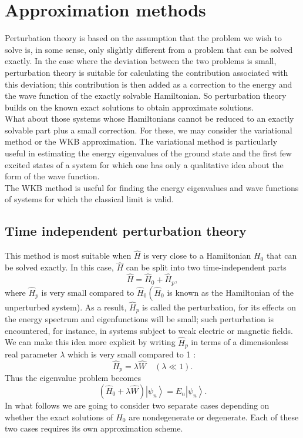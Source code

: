 \chapter{Approximation methods}
Perturbation theory is based on the assumption that the problem we wish to solve is, in some sense, only slightly different from a problem that can be solved exactly. In the case where the deviation between the two problems is small, perturbation theory is suitable for calculating the contribution associated with this deviation; this contribution is then added as a correction to the energy and the wave function of the exactly solvable Hamiltonian. So perturbation theory builds on the known exact solutions to obtain approximate solutions.\\
What about those systems whose Hamiltonians cannot be reduced to an exactly solvable part plus a small correction. For these, we may consider the variational method or the WKB approximation. The variational method is particularly useful in estimating the energy eigenvalues of the ground state and the first few excited states of a system for which one has only a qualitative idea about the form of the wave function.\\
The WKB method is useful for finding the energy eigenvalues and wave functions of systems for which the classical limit is valid. 
\section{Time independent perturbation theory}
This method is most suitable when $\hat{H}$ is very close to a Hamiltonian $H_{0}$ that can be solved exactly. In this case, $\hat{H}$ can be split into two time-independent parts
$$
\hat{H}=\hat{H}_{0}+\hat{H}_{p},
$$
where $\hat{H}_{p}$ is very small compared to $\hat{H}_{0}\left(\hat{H}_{0}\right.$ is known as the Hamiltonian of the unperturbed system). As a result, $\hat{H}_{p}$ is called the perturbation, for its effects on the energy spectrum and eigenfunctions will be small; such perturbation is encountered, for instance, in systems subject to weak electric or magnetic fields. We can make this idea more explicit by writing $\hat{H}_{p}$ in terms of a dimensionless real parameter $\lambda$ which is very small compared to 1 :
$$
\hat{H}_{p}=\lambda \hat{W} \quad(\lambda \ll 1) .
$$
Thus the eigenvalue problem becomes
$$
\left(\hat{H}_{0}+\lambda \hat{W}\right)\left|\psi_{n}\right\rangle=E_{n}\left|\psi_{n}\right\rangle .
$$
In what follows we are going to consider two separate cases depending on whether the exact solutions of $\hat{H}_{0}$ are nondegenerate or degenerate. Each of these two cases requires its own approximation scheme.
